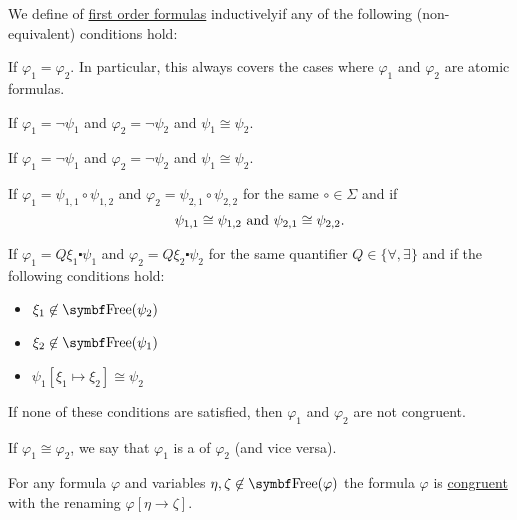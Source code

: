 \begin{definition}\label{def:first_order_formula_congruence}
  We define \hyperref[def:equivalence_relation]{} of \hyperref[def:first_order_language/formula]{first order formulas} inductively\IND if any of the following (non-equivalent) conditions hold:
  \begin{DefEnum}
     If \( \varphi_1 = \varphi_2 \). In particular, this always covers the cases where \( \varphi_1 \) and \( \varphi_2 \) are atomic formulas.

     If \( \varphi_1 = \neg \psi_1 \) and \( \varphi_2 = \neg \psi_2 \) and \( \psi_1 \cong \psi_2 \).

     If \( \varphi_1 = \neg \psi_1 \) and \( \varphi_2 = \neg \psi_2 \) and \( \psi_1 \cong \psi_2 \).

     If \( \varphi_1 = \psi_{1,1} \circ \psi_{1,2} \) and \( \varphi_2 = \psi_{2,1} \circ \psi_{2,2} \) for the same \( \circ \in \Sigma \) and if
    \begin{equation*}
      \psi_{1,1} \cong \psi_{1,2} \text{ and } \psi_{2,1} \cong \psi_{2,2}.
    \end{equation*}

     If \( \varphi_1 = Q \xi_1 \centerdot \psi_1 \) and \( \varphi_2 = Q \xi_2 \centerdot \psi_2 \) for the same quantifier \( Q \in \{ \forall, \exists \} \) and if the following conditions hold:
    \begin{itemize}
      \item \( \xi_1 \not\in \Bold{Free}(\psi_2) \)
      \item \( \xi_2 \not\in \Bold{Free}(\psi_1) \)
      \item \( \psi_1[\xi_1 \mapsto \xi_2] \cong \psi_2 \)
    \end{itemize}
  \end{DefEnum}

  If none of these conditions are satisfied, then \( \varphi_1 \) and \( \varphi_2 \) are not congruent.

  If \( \varphi_1 \cong \varphi_2 \), we say that \( \varphi_1 \) is a  of \( \varphi_2 \) (and vice versa).
\end{definition}

\begin{lemma}\label{def:first_order_formula_congruence_substitution}
  For any formula \( \varphi \) and variables \( \eta, \zeta \not\in \Bold{Free}(\varphi) \) the formula \( \varphi \) is \hyperref[def:first_order_formula_congruence]{congruent} with the renaming \( \varphi[\eta \to \zeta] \).
\end{lemma}

